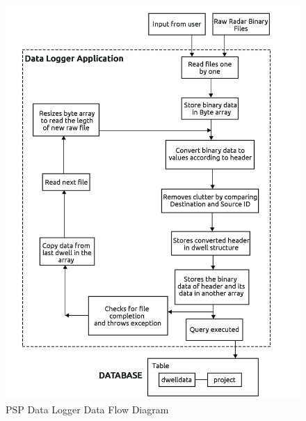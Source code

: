 \documentclass[14pt]{article} %
\begin{document}
\begin{figure}[H]
  \includegraphics[width=\linewidth]{flow-diagram.jpg}
  \caption{PSP Data Logger Data Flow Diagram}
  \label{fig:figure 18}
\end{figure}
\end{document}
